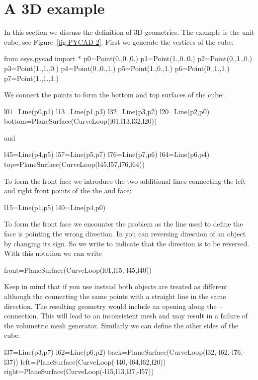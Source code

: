 \section{A 3D example}
In this section we discuss the definition of 3D geometries. The example is the unit cube, see Figure~\ref{fig:PYCAD 2}. First we generate the vertices of the cube:
\begin{python}
from esys.pycad import *
p0=Point(0.,0.,0.)
p1=Point(1.,0.,0.)
p2=Point(0.,1.,0.)
p3=Point(1.,1.,0.)
p4=Point(0.,0.,1.)
p5=Point(1.,0.,1.)
p6=Point(0.,1.,1.)
p7=Point(1.,1.,1.)
\end{python}
We connect the points to form the bottom and top surfaces of the cube:
\begin{python}
l01=Line(p0,p1)
l13=Line(p1,p3)
l32=Line(p3,p2)
l20=Line(p2,p0)
bottom=PlaneSurface(CurveLoop(l01,l13,l32,l20))
\end{python}
and 
\begin{python}
l45=Line(p4,p5)
l57=Line(p5,p7)
l76=Line(p7,p6)
l64=Line(p6,p4)
top=PlaneSurface(CurveLoop(l45,l57,l76,l64))
\end{python}
To form the front face we introduce the two additional lines connecting the left and right front 
points of the the  and  face:
\begin{python}
l15=Line(p1,p5)
l40=Line(p4,p0)
\end{python}
To form the front face we encounter the problem as the line  used to define the 
 face is pointing the wrong direction.  In \pycad you can reversing direction of an
object by changing its sign. So we write  to indicate that the direction is to be reversed. With this notation we can write
\begin{python}
front=PlaneSurface(CurveLoop(l01,l15,-l45,l40))
\end{python}
Keep in mind that if you use  instead  both objects are treated as different although the connecting the same points with a straight line in the same direction. The resulting geometry would include an opening along the -- connection. This will lead to an inconsistent mesh and may result in a failure of the volumetric mesh generator. Similarly we can define the other sides of the cube:
\begin{python}
l37=Line(p3,p7)
l62=Line(p6,p2)
back=PlaneSurface(CurveLoop(l32,-l62,-l76,-l37))
left=PlaneSurface(CurveLoop(-l40,-l64,l62,l20))
right=PlaneSurface(CurveLoop(-l15,l13,l37,-l57))
\end{python}
